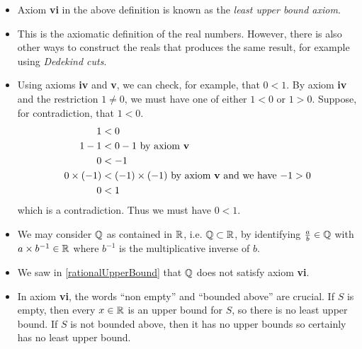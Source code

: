 \documentclass[../main.tex]{subfiles}
\begin{document}
\begin{remark}[Notes]
  \begin{itemize}
    \item Axiom \textbf{vi} in the above definition is known as the \textit{least upper bound axiom}.
    \item This is the axiomatic definition of the real numbers.
      However, there is also other ways to construct the reals that produces the same result, for example using \textit{Dedekind cuts}.
  \end{itemize}
\end{remark}
\begin{remark}[Remarks]
  \begin{itemize}
    \item Using axioms \textbf{iv} and \textbf{v}, we can check, for example, that $0 < 1$.
      By axiom \textbf{iv} and the restriction $1 \neq 0$, we must have one of either $1 < 0$ or $1 > 0$.
      Suppose, for contradiction, that $1 < 0$.
      \begin{align*}
        1 &< 0 \\
        1 - 1 &< 0 - 1 \text{ by axiom \textbf{v}} \\
        0 &< - 1 \\
        0 \times (-1) &< (-1) \times (-1) \text{ by axiom \textbf{v} and we have $-1 > 0$} \\
        0 &< 1
      \end{align*}
      which is a contradiction.
      Thus we must have $0 < 1$.
    \item We may consider $\mathbb{Q}$ as contained in $\mathbb{R}$, i.e. $\mathbb{Q} \subset \mathbb{R}$, by identifying $\frac{a}{b} \in \mathbb{Q}$ with $a \times b^{-1} \in \mathbb{R}$ where $b^{-1}$ is the multiplicative inverse of $b$.
    \item We saw in \cref{rationalUpperBound} that $\mathbb{Q}$ does not satisfy axiom \textbf{vi}.
    \item In axiom \textbf{vi}, the words ``non empty'' and ``bounded above'' are crucial.
      If $S$ is empty, then every $x \in \mathbb{R}$ is an upper bound for $S$, so there is no least upper bound.
      If $S$ is not bounded above, then it has no upper bounds so certainly has no least upper bound.
  \end{itemize}
\end{remark}
\end{document}
